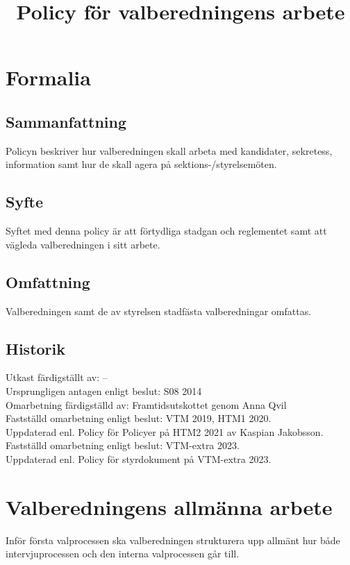\documentclass{dsekprotokoll}
\title{Policy för valberedningens arbete}
\author{}
\begin{document}
\maketitle

\section{Formalia}
\subsection{Sammanfattning}
Policyn beskriver hur valberedningen skall arbeta med kandidater, sekretess, information samt
hur de skall agera på sektions-/styrelsemöten.

\subsection{Syfte}
Syftet med denna policy är att förtydliga stadgan och reglementet samt att vägleda valberedningen i sitt arbete.

\subsection{Omfattning}
Valberedningen samt de av styrelsen stadfästa valberedningar omfattas.

\subsection{Historik}
Utkast färdigställt av: – \\
Ursprungligen antagen enligt beslut: S08 2014\\
Omarbetning färdigställd av: Framtidsutskottet genom Anna Qvil\\
Fastställd omarbetning enligt beslut: VTM 2019, HTM1 2020. \\
Uppdaterad enl. Policy för Policyer på HTM2 2021 av Kaspian Jakobsson.\\
Fastställd omarbetning enligt beslut: VTM-extra 2023.\\
Uppdaterad enl. Policy för styrdokument på VTM-extra 2023.


\section{Valberedningens allmänna arbete}

Inför första valprocessen ska valberedningen strukturera upp allmänt hur både intervjuprocessen och den
interna valprocessen går till.
\end{document}
